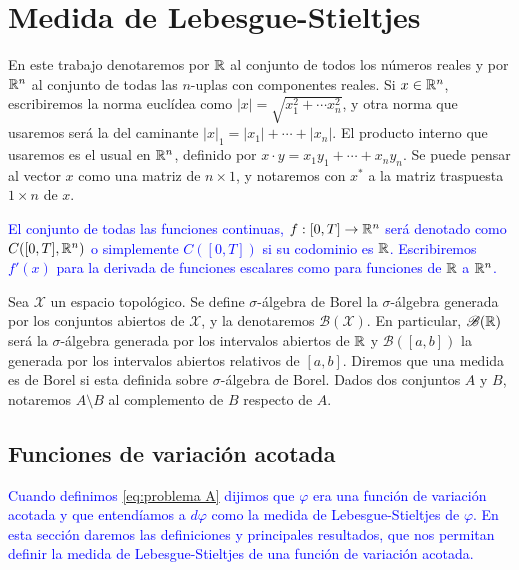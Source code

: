 \chapter{Medida de Lebesgue-Stieltjes}




En este trabajo denotaremos por $\mathbb{R}$ al conjunto de todos los números reales y por $\mathbb{R}^n$ al conjunto de todas las $n$-uplas con componentes reales.  Si $x\in \mathbb{R}^n$, escribiremos la norma euclídea como $|x|=\sqrt{x_1^2+\cdots x_n^2}$, y otra norma que usaremos será la del caminante  $|x|_1=|x_1|+\cdots +|x_n|$.   
El producto interno que usaremos es el  usual en $\mathbb{R}^n $, definido por  $x\cdot y=x_1y_1 + \cdots+
x_ny_n$. Se puede pensar al vector $x$ como una matriz de $n\times 1$, y notaremos con $x^*$ a la matriz traspuesta $1\times n$ de $x$.

\textcolor{blue}{El conjunto de todas las funciones continuas, $f:[0,T]\to \mathbb{R}^n$ será denotado como $C([0,T],\mathbb{R}^n)$ o simplemente $C([0,T])$ si su codominio es $\mathbb{R}$.    Escribiremos $f'(x)$ para la derivada de funciones escalares como para funciones de $\mathbb{R}$ a $\mathbb{R}^n$. }

Sea $\mathcal{X}$ un espacio topológico. Se define   $\sigma$-álgebra  de Borel  la $\sigma$-álgebra generada por los conjuntos abiertos de $\mathcal{X}$, y la  denotaremos $\mathscr{B}(\mathcal{X})$. 
En particular, $\mathscr{B}(\mathbb{R})$ será la $\sigma$-álgebra generada por los intervalos abiertos de $\mathbb{R}$ y $\mathscr{B}([a,b])$ la generada por los intervalos abiertos relativos de $[a,b]$. Diremos que una medida es de Borel si esta definida sobre  $\sigma$-álgebra de Borel.  Dados dos conjuntos $A$ y $B$, notaremos $A\setminus B$ al complemento de $B$ respecto de $A$.




\section{Funciones de variación acotada}
\textcolor{blue}{Cuando definimos \ref{eq:problema A} dijimos que $\varphi$ era una función de variación acotada y que entendíamos a  $d\varphi$ como la medida de Lebesgue-Stieltjes de $\varphi$. En esta sección daremos las definiciones y principales resultados, que nos permitan definir la medida de Lebesgue-Stieltjes de una función de variación acotada.}

